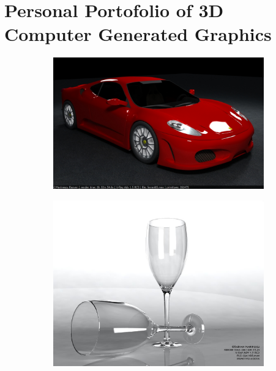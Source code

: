 \documentclass[11pt,a4paper]{article}
\begin{document}
\section{Personal Portofolio of 3D Computer Generated Graphics}

\begin{figure}[H]
 \begin{subfigure}{0.32\textwidth}
 \centering
 \vspace{1em}
  \includegraphics[width=\textwidth]{images/ferrari1440x900.jpg}
 \end{subfigure}
 \begin{subfigure}{0.32\textwidth}
 \centering
  \includegraphics[width=\textwidth]{images/glass03.jpg}
 \end{subfigure}
 \begin{subfigure}{0.32\textwidth}

\end{subfigure}
\end{figure}
\end{document}

